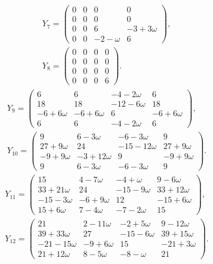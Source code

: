 \documentclass[11pt]{article}
\theoremstyle{definition}
\theoremstyle{remark}
\begin{document}
\[
\begin{gathered}
Y_{7}=\begin{pmatrix}0&0&0&0\\
0&0&0&0\\
0&0&6&-3+3\omega\\
0&0&-2-\omega&6\end{pmatrix},\\[1ex]
Y_{8}=\begin{pmatrix}0&0&0&0\\
0&0&0&0\\
0&0&0&0\\
0&0&0&6\end{pmatrix} .
\end{gathered}
\]
\[
\begin{gathered}
Y_{9}=\begin{pmatrix}6&6&-4-2\omega&6\\
18&18&-12-6\omega&18\\
-6+6\omega&-6+6\omega&6&-6+6\omega\\
6&6&-4-2\omega&6\end{pmatrix},\\[1ex]
Y_{10}=\begin{pmatrix}9&6-3\omega&-6-3\omega&9\\
27+9\omega&24&-15-12\omega&27+9\omega\\
-9+9\omega&-3+12\omega&9&-9+9\omega\\
9&6-3\omega&-6-3\omega&9\end{pmatrix} .
\end{gathered}
\]
\[
\begin{gathered}
Y_{11}=\begin{pmatrix}15&4-7\omega&-4+\omega&9-6\omega\\
33+21\omega&24&-15-9\omega&33+12\omega\\
-15-3\omega&-6+9\omega&12&-15+6\omega\\
15+6\omega&7-4\omega&-7-2\omega&15\end{pmatrix},\\[1ex]
Y_{12}=\begin{pmatrix}21&2-11\omega&-2+5\omega&9-12\omega\\
39+33\omega&27&-15-6\omega&39+15\omega\\
-21-15\omega&-9+6\omega&15&-21+3\omega\\
21+12\omega&8-5\omega&-8-\omega&21\end{pmatrix} .
\end{gathered}
\]
\end{document}
